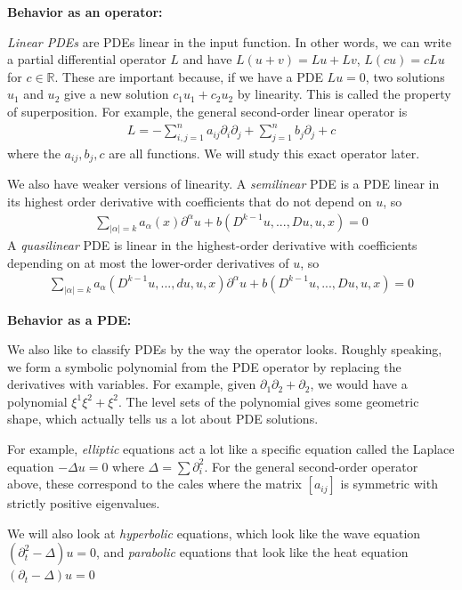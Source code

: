 \documentclass{article}
\newcommand{\R}{{\mathbb{R}}}
\newcommand{\pd}{\partial}
\begin{document}
	\textbf{Behavior as an operator:}
	
	\textit{Linear PDEs} are PDEs linear in the input function. In other words, we can write a partial differential operator $L$ and have $L(u+v) = Lu + Lv$, $L(c u) = cLu$ for $c \in \R$. These are important because, if we have a PDE $Lu = 0$, two solutions $u_1$ and $u_2$ give a new solution $c_1u_1 + c_2u_2$ by linearity. This is called the property of superposition. For example, the general second-order linear operator is
	\begin{align*}
		L = - \sum_{i,j=1}^{n} a_{ij} \pd_{i}\pd_{j} + \sum_{j=1}^{n} b_{j} \pd_{j} + c
	\end{align*}
	where the $a_{ij},b_{j},c$ are all functions. We will study this exact operator later. 
	
	We also have weaker versions of linearity. A \textit{semilinear} PDE is a PDE linear in its highest order derivative with coefficients that do not depend on $u$, so 
	\begin{align*}
		\sum_{|\alpha| = k} a_{\alpha}(x) \pd^{\alpha}u + b(D^{k-1}u,...,Du,u,x) = 0
	\end{align*}
	A \textit{quasilinear} PDE is linear in the highest-order derivative with coefficients depending on at most the lower-order derivatives of $u$, so 
	\begin{align*}
		\sum_{|\alpha| = k} a_{\alpha}(D^{k-1}u,..., du,u,x) \pd^{\alpha}u + b(D^{k-1}u,...,Du,u,x) = 0
	\end{align*}
	
	
	\textbf{Behavior as a PDE:}
	
	We also like to classify PDEs by the way the operator looks. Roughly speaking, we form a symbolic polynomial from the PDE operator by replacing the derivatives with variables. For example, given $\pd_{1}\pd_{2} + \pd_{2}$, we would have a polynomial $\xi^{1}\xi^2 + \xi^2$. The level sets of the polynomial gives some geometric shape, which actually tells us a lot about PDE solutions. 
	
	For example, \textit{elliptic} equations act a lot like a specific equation called the Laplace equation $-\Delta u = 0$ where $\Delta = \sum \pd_{i}^{2} $. For the general second-order operator above, these correspond to the cales where the matrix $[a_{ij}]$ is symmetric with strictly positive eigenvalues. 
	
	We will also look at \textit{hyperbolic} equations, which look like the wave equation $(\pd_{t}^{2} - \Delta) u = 0$, and \textit{parabolic} equations that look like the heat equation $(\pd_{t} - \Delta )u = 0$
	
\end{document}
